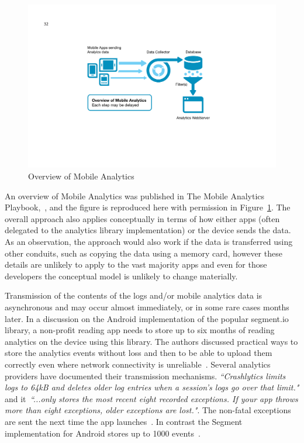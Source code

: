 \begin{figure}[ht]
    \centering
    \includegraphics[width=15cm]{images/mobile-analytics-playbook/Chart-08-Overview-of-MobileAnalytics.png}
    \caption{Overview of Mobile Analytics~\citep{harty_aymer_playbook_2016}}
    \label{fig:map2016-overview-of-mobile-analytics}
\end{figure}

An overview of Mobile Analytics was published in The Mobile Analytics Playbook,~\citep{harty_aymer_playbook_2016}, and the figure is reproduced here with permission in Figure~\ref{fig:map2016-overview-of-mobile-analytics}. The overall approach also applies conceptually in terms of how either apps (often delegated to the analytics library implementation) or the device sends the data. As an observation, the approach would also work if the data is transferred using other conduits, such as copying the data using a memory card, however these details are unlikely to apply to the vast majority apps and even for those developers the conceptual model is unlikely to change materially.

Transmission of the contents of the logs and/or mobile analytics data is asynchronous and may occur almost immediately, or in some rare cases months later. In a discussion on the Android implementation of the popular segment.io library, a non-profit reading app needs to store up to six months of reading analytics on the device using this library. The authors discussed practical ways to store the analytics events without loss and then to be able to upload them correctly even where network connectivity is unreliable~\citep{segmentio_supporting_6_months_offline}. Several analytics providers have documented their transmission mechanisms. \emph{``Crashlytics limits logs to 64kB and deletes older log entries when a session's logs go over that limit."} and it~\emph{``...only stores the most recent eight recorded exceptions. If your app throws more than eight exceptions, older exceptions are lost."}.  The non-fatal exceptions are sent the next time the app launches~\citep{firebasecrashlytics2020_customize_crash_reports}. In contrast the Segment implementation for Android stores up to 1000 events~\citep{segment_analytics_for_android_docs}.


